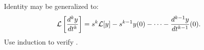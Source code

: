 \documentclass{ximera}
\begin{document}
\begin{exercise}   \label{exer:kderLap}
Identity  may be 
generalized to: 
\begin{equation}  \label{LapDerk}
{\cal L}\left[\frac{d^k y}{dt^k}\right] =
s^k{\cal L}[y] - s^{k-1} y(0) - \cdots - \frac{d^{k-1} y}{dt^{k-1}}(0).
\end{equation}
Use induction to verify . 
\end{exercise}
\end{document}
